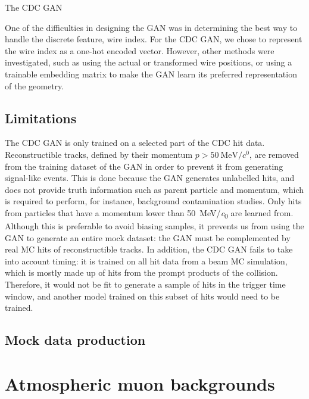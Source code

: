 The CDC GAN %

One of the difficulties in designing the GAN was in determining the best way
to handle the discrete feature, wire index. For the CDC GAN, we chose to
represent the wire index as a one-hot encoded vector. However, other methods
were investigated, such as using the actual or transformed wire positions, or
using a trainable embedding matrix to make the GAN learn its preferred
representation of the geometry.



\subsection{Limitations}
The CDC GAN is only trained on a selected part of the CDC hit data.
Reconstructible tracks, defined by their momentum $p>\SI{50}{\MeV/\clight}$, are
removed from the training dataset of the GAN in order to prevent it from
generating signal-like events. This is done because the GAN generates unlabelled
hits, and does not provide truth information such as parent particle and
momentum, which is required to perform, for instance, background contamination
studies.
Only hits from particles that have a momentum lower than \SI{50}{\MeV/\clight}
are learned from. Although this is preferable to avoid biasing samples, it
prevents us from using the GAN to generate an entire mock dataset: the GAN must
be complemented by real MC hits of reconstructible tracks.
In addition, the CDC GAN fails to take into account timing: it is trained on all
hit data from a beam MC simulation, which is mostly made up of hits from the
prompt products of the collision. Therefore, it would not be fit to generate a
sample of hits in the trigger time window, and another model trained on this
subset of hits would need to be trained.




\subsection{Mock data production}

\section{Atmospheric muon backgrounds}
